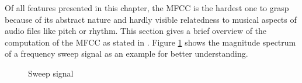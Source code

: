 Of all features presented in this chapter, the MFCC is the hardest one to grasp because of its abstract nature and hardly visible relatedness to musical aspects of audio files like pitch or rhythm. This section gives a brief overview of the computation of the MFCC as stated in \cite[pp. 55ff]{knees1}.
Figure \ref{sweep} shows the magnitude spectrum of a frequency sweep signal as an example for better understanding.
\begin{figure}[htbp]
	\centering
	\caption{Sweep signal}	
	\label{sweep}
\end{figure}
